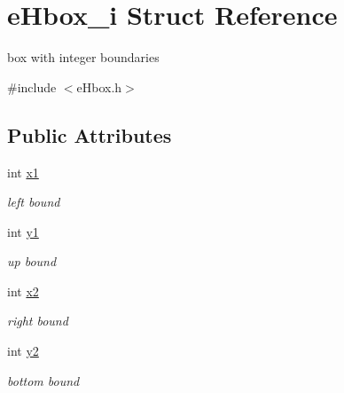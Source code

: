 \hypertarget{structeHbox__i}{\section{e\-Hbox\-\_\-i Struct Reference}
\label{structeHbox__i}
}


box with integer boundaries  




{\ttfamily \#include $<$e\-Hbox.\-h$>$}

\subsection*{Public Attributes}
\begin{DoxyCompactItemize}
\item 
\hypertarget{structeHbox__i_a2dc32f539b205b93a4ebaf2af1cd0de5}{int \hyperlink{structeHbox__i_a2dc32f539b205b93a4ebaf2af1cd0de5}{x1}}\label{structeHbox__i_a2dc32f539b205b93a4ebaf2af1cd0de5}

\begin{DoxyCompactList}\small\item\em left bound \end{DoxyCompactList}\item 
\hypertarget{structeHbox__i_a8fb63de1e169b5d5829ad5461c29c67b}{int \hyperlink{structeHbox__i_a8fb63de1e169b5d5829ad5461c29c67b}{y1}}\label{structeHbox__i_a8fb63de1e169b5d5829ad5461c29c67b}

\begin{DoxyCompactList}\small\item\em up bound \end{DoxyCompactList}\item 
\hypertarget{structeHbox__i_a83360dc7f21b5e21e11c6a4c8d24b64a}{int \hyperlink{structeHbox__i_a83360dc7f21b5e21e11c6a4c8d24b64a}{x2}}\label{structeHbox__i_a83360dc7f21b5e21e11c6a4c8d24b64a}

\begin{DoxyCompactList}\small\item\em right bound \end{DoxyCompactList}\item 
\hypertarget{structeHbox__i_a00f298dd8b5bd49c63d333a9bc0a10d4}{int \hyperlink{structeHbox__i_a00f298dd8b5bd49c63d333a9bc0a10d4}{y2}}\label{structeHbox__i_a00f298dd8b5bd49c63d333a9bc0a10d4}

\begin{DoxyCompactList}\small\item\em bottom bound \end{DoxyCompactList}\end{DoxyCompactItemize}


